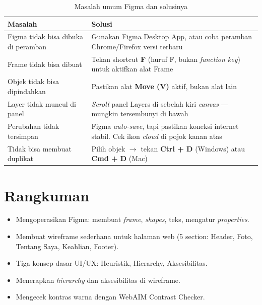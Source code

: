 \begin{table}[ht]
\centering
\caption{Masalah umum Figma dan solusinya}
\label{tab:m02-troubleshoot}
\small
\begin{tabular}{p{4.5cm}p{8cm}}
\toprule
\textbf{Masalah} & \textbf{Solusi} \\
\midrule
Figma tidak bisa dibuka di peramban & Gunakan Figma Desktop App, atau coba peramban Chrome/Firefox versi terbaru \\
Frame tidak bisa dibuat & Tekan shortcut \textbf{F} (huruf F, bukan \emph{function key}) untuk aktifkan alat Frame \\
Objek tidak bisa dipindahkan & Pastikan alat \textbf{Move (V)} aktif, bukan alat lain \\
Layer tidak muncul di panel & \emph{Scroll} panel Layers di sebelah kiri \emph{canvas} --- mungkin tersembunyi di bawah \\
Perubahan tidak tersimpan & Figma \emph{auto-save}, tapi pastikan koneksi internet stabil. Cek ikon \emph{cloud} di pojok kanan atas \\
Tidak bisa membuat duplikat & Pilih objek $\rightarrow$ tekan \textbf{Ctrl + D} (Windows) atau \textbf{Cmd + D} (Mac) \\
\bottomrule
\end{tabular}
\end{table}

\section{Rangkuman}
\label{sec:m02-rangkuman}

\begin{itemize}
  \item Mengoperasikan Figma: membuat \emph{frame}, \emph{shapes}, teks, mengatur \emph{properties}.
  \item Membuat wireframe sederhana untuk halaman web (5 section: Header, Foto, Tentang Saya, Keahlian, Footer).
  \item Tiga konsep dasar UI/UX: Heuristik, Hierarchy, Aksesibilitas.
  \item Menerapkan \emph{hierarchy} dan aksesibilitas di wireframe.
  \item Mengecek kontras warna dengan WebAIM Contrast Checker.
\end{itemize}
